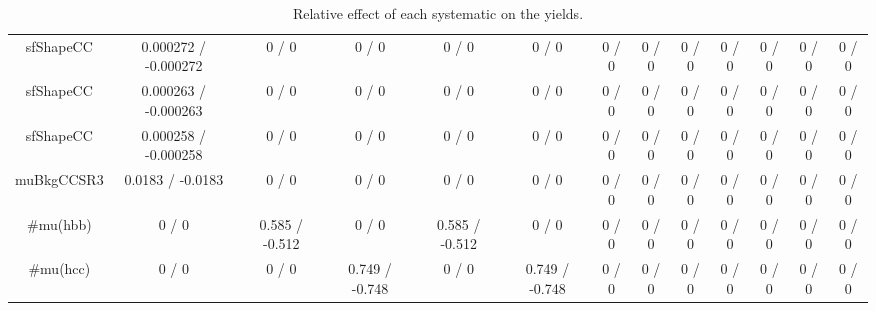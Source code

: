\documentclass[10pt]{article}
\begin{document}
\begin{table}[htbp]
\begin{center}
\begin{tabular}{|c|c|c|c|c|c|c|c|c|c|c|c|c|}
  sfShapeCC & 0.000272 / -0.000272 & 0 / 0 & 0 / 0 & 0 / 0 & 0 / 0 & 0 / 0 & 0 / 0 & 0 / 0 & 0 / 0 & 0 / 0 & 0 / 0 & 0 / 0 \\ 
  sfShapeCC & 0.000263 / -0.000263 & 0 / 0 & 0 / 0 & 0 / 0 & 0 / 0 & 0 / 0 & 0 / 0 & 0 / 0 & 0 / 0 & 0 / 0 & 0 / 0 & 0 / 0 \\ 
  sfShapeCC & 0.000258 / -0.000258 & 0 / 0 & 0 / 0 & 0 / 0 & 0 / 0 & 0 / 0 & 0 / 0 & 0 / 0 & 0 / 0 & 0 / 0 & 0 / 0 & 0 / 0 \\ 
  muBkgCCSR3 & 0.0183 / -0.0183 & 0 / 0 & 0 / 0 & 0 / 0 & 0 / 0 & 0 / 0 & 0 / 0 & 0 / 0 & 0 / 0 & 0 / 0 & 0 / 0 & 0 / 0 \\ 
  #mu(hbb) & 0 / 0 & 0.585 / -0.512 & 0 / 0 & 0.585 / -0.512 & 0 / 0 & 0 / 0 & 0 / 0 & 0 / 0 & 0 / 0 & 0 / 0 & 0 / 0 & 0 / 0 \\ 
  #mu(hcc) & 0 / 0 & 0 / 0 & 0.749 / -0.748 & 0 / 0 & 0.749 / -0.748 & 0 / 0 & 0 / 0 & 0 / 0 & 0 / 0 & 0 / 0 & 0 / 0 & 0 / 0 \\ 
\hline 
\end{tabular} 
\caption{Relative effect of each systematic on the yields.} 
\end{center} 
\end{table} 
\end{document}

